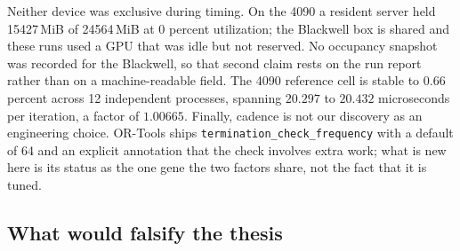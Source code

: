 Neither device was exclusive during timing. On the 4090 a resident server held
15427\,MiB of 24564\,MiB at 0 percent utilization; the Blackwell box is shared
and these runs used a GPU that was idle but not reserved. No occupancy snapshot
was recorded for the Blackwell, so that second claim rests on the run report
rather than on a machine-readable field. The 4090 reference cell is stable to
0.66 percent across 12 independent processes, spanning $20.297$ to $20.432$
microseconds per iteration, a factor of $1.00665$.
Finally, cadence is not our discovery as an engineering choice. OR-Tools ships
\texttt{termination\_check\_frequency} with a default of 64 and an explicit
annotation that the check involves extra work; what is new here is its status as
the one gene the two factors share, not the fact that it is tuned.

\subsection{What would falsify the thesis}

